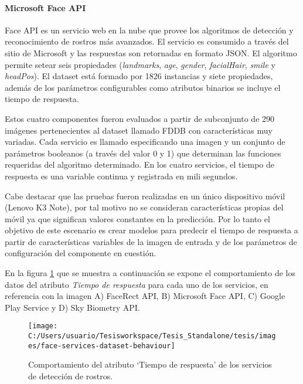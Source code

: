 \paragraph{Microsoft Face API}

Face API es un servicio web en la nube que provee los algoritmos de
detección y reconocimiento de rostros más avanzados. El servicio es
consumido a través del sitio de Microsoft y las respuestas son retornadas
en formato \ac{JSON}. El algoritmo permite setear seis propiedades
(\emph{landmarks}, \emph{age}, \emph{gender}, \emph{facialHair}, \emph{smile}
y \emph{headPos}). El dataset está formado por 1826 instancias y siete
propiedades, además de los parámetros configurables como atributos
binarios se incluye el tiempo de respuesta. 

Estos cuatro componentes fueron evaluados a partir de subconjunto
de 290 imágenes pertenecientes al dataset llamado FDDB \citep{fddbTechReport}
con características muy variadas. Cada servicio es llamado especificando
una imagen y un conjunto de parámetros booleanos (a través del valor
0 y 1) que determinan las funciones requeridas del algoritmo determinado.
En los cuatro servicios, el tiempo de respuesta es una variable continua
y registrada en mili segundos. 

Cabe destacar que las pruebas fueron realizadas en un único dispositivo
móvil (Lenovo K3 Note), por tal motivo no se consideran características
propias del móvil ya que significan valores constantes en la predicción.
Por lo tanto el objetivo de este escenario es crear modelos para predecir
el tiempo de respuesta a partir de características variables de la
imagen de entrada y de los parámetros de configuración del componente
en cuestión.

En la figura \ref{fig:face-services-dataset-behaviour} que se muestra
a continuación se expone el comportamiento de los datos del atributo
\emph{Tiempo de respuesta} para cada uno de los servicios, en referencia
con la imagen A) FaceRect API, B) Microsoft Face API, C) Google Play
Service y D) Sky Biometry API. 

\begin{figure}[H]
\begin{centering}
\texttt{[image: C:/Users/usuario/Tesisworkspace/Tesis\_Standalone/tesis/images/face-services-dataset-behaviour]}
\par\end{centering}

\caption{Comportamiento del atributo ‘Tiempo de respuesta’ de los servicios
de detección de rostros.\label{fig:face-services-dataset-behaviour}}
\end{figure}


